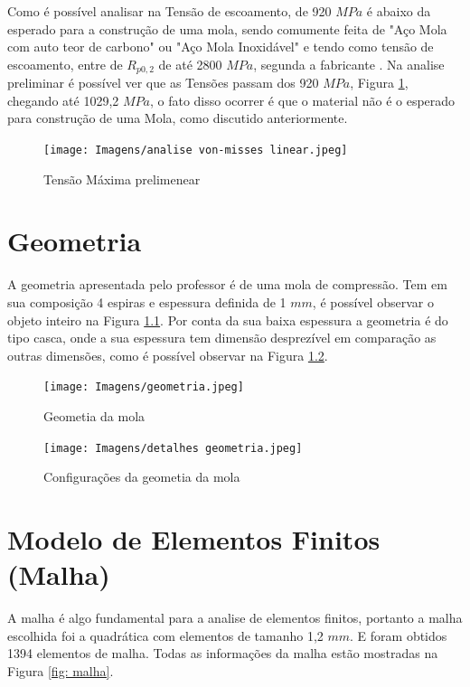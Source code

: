 \documentclass[acronym,symbols]{fei}
\begin{document}
Como é possível analisar na Tensão de escoamento, de 920 $MPa$ é abaixo da esperado para a construção de uma mola, sendo comumente feita de "Aço Mola com auto teor de carbono" ou "Aço Mola Inoxidável" \cite{centuryspring} e tendo como tensão de escoamento, entre de $R_{p0,2}$  de até 2800 $MPa$, segunda a fabricante \textcite{waelzholz} . Na analise preliminar é possível ver que as Tensões passam dos 920 $MPa$, Figura \ref{fig: preliminar}, chegando até 1029,2 $MPa$, o fato disso ocorrer é que o material não é o esperado para construção de uma Mola, como discutido anteriormente.

\begin{figure}[!htb]
    \centering
    \caption{Tensão Máxima prelimenear}
    \texttt{[image: Imagens/analise von-misses linear.jpeg]}
    \label{fig: preliminar}
\end{figure}


\chapter{Geometria}

A geometria apresentada pelo professor é de uma mola de compressão. Tem em sua composição 4 espiras e espessura definida de 1 $mm$, é possível observar o objeto inteiro na Figura \ref{fig: geometria}. Por conta da sua baixa espessura a geometria é do tipo casca, onde a sua espessura tem dimensão desprezível em comparação as outras dimensões, como é possível observar na Figura \ref{fig: detalhes geometria}.

\begin{figure}[!htb]
    \centering
    \caption{Geometia da mola}
    \texttt{[image: Imagens/geometria.jpeg]}
    \label{fig: geometria}
\end{figure}

\begin{figure}[!htb]
    \centering
    \caption{Configurações da geometia da mola}
    \texttt{[image: Imagens/detalhes geometria.jpeg]}
    \label{fig: detalhes geometria}
\end{figure}


\chapter{Modelo de Elementos Finitos (Malha)}

A malha é algo fundamental para a analise de elementos finitos, portanto a malha escolhida foi a quadrática com elementos de tamanho 1,2 $mm$. E foram obtidos 1394 elementos de malha. Todas as informações da malha estão mostradas na Figura \ref{fig: malha}.
\end{document}
